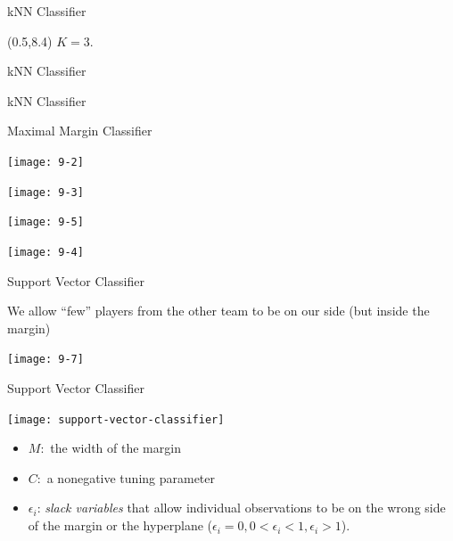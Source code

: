 \documentclass[14pt]{beamer}
\begin{document}
\begin{frame}{kNN Classifier}
\begin{textblock}{10}(0.5,8.4)
$K=3$.
\end{textblock}
\end{frame}

\begin{frame}{kNN Classifier}
\end{frame}


\begin{frame}{kNN Classifier}
\end{frame}



\begin{frame}{Maximal Margin Classifier}

   \begin{minipage}[c]{.65\linewidth}
      \texttt{[image: 9-2]}
   \end{minipage} \hfill
   \begin{minipage}[c]{.32\linewidth}
      \texttt{[image: 9-3]}
   \end{minipage}
   
   \begin{minipage}[c]{.68\linewidth}
      \texttt{[image: 9-5]}
   \end{minipage} \hfill
   \begin{minipage}[c]{.28\linewidth}
      \texttt{[image: 9-4]}
   \end{minipage} 
   


\end{frame}

\begin{frame}{Support Vector Classifier}

{\small We allow ``few'' players from the other team to be on our side (but inside the margin)}

\centerline{\texttt{[image: 9-7]}}

\end{frame}

\begin{frame}{Support Vector Classifier}

\centerline{\texttt{[image: support-vector-classifier]}}

\begin{itemize}\small
	\item $M:$ the width of the margin
	\item $C:$ a nonegative tuning parameter
	\item $\epsilon_i$: \emph{slack variables} that allow individual observations to be on the wrong side of the margin or the hyperplane ($\epsilon_i = 0, 0 <\epsilon_i < 1, \epsilon_i > 1$).
\end{itemize}


\end{frame}
\end{document}

